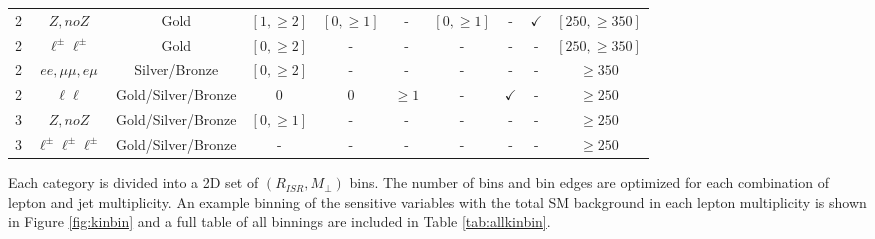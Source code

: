 \begin{table}
\begin{adjustwidth}{-0.7in}{-1in}
\begin{tabular}{|c|c|c|c|c|c|c|c|c|c|}
2 & $Z, no Z$ & Gold & $[1,\geq 2]$ & $[0, \geq 1]$& - & $[0,\geq 1]$ & - & $\checkmark$ & $[250,\geq350]$  \\
2 & $\ell^\pm \ell^\pm$ & Gold & $[0,\geq 2]$ & - & - &  - & - & - & $[250,\geq350]$ \\
2 & $ee, \mu\mu, e\mu$ & Silver/Bronze & $[0,\geq 2]$ & - & - & - & - & - & $\geq350$ \\
2 & $\ell \ell$ & Gold/Silver/Bronze & 0 & 0 & $\geq 1 $ & - & $\checkmark$ & - & $\geq 250$\\
\hline
3 & $Z, no Z$ & Gold/Silver/Bronze & $[0,\geq 1]$ & - & - & - & - & - & $\geq 250$ \\
3 & $\ell^\pm \ell^\pm \ell^\pm$ & Gold/Silver/Bronze & - & - & -& - & - & -& $\geq 250$ \\
\hline
\end{tabular} 
\end{adjustwidth}
\label{tab:cats}
\end{table}



Each category is divided into a 2D set of $(R_{ISR}, M_\perp)$ bins. The number of bins and bin edges are optimized for each combination of lepton and jet multiplicity. An example binning of the sensitive variables with the total SM background in each lepton multiplicity is shown in Figure \ref{fig:kinbin} and a full table of all binnings are included in Table \ref{tab:allkinbin}.

